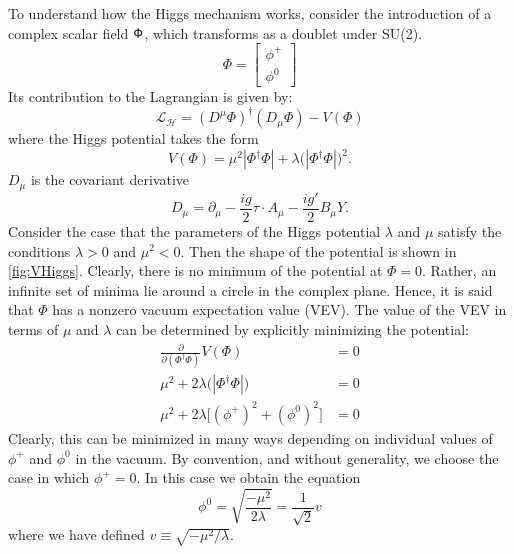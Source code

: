 To understand how the Higgs mechanism works, consider the introduction of a complex scalar field $\sf \Phi$, which 
transforms as a doublet under SU(2).
\begin{equation}
    \label{eqn:higgsField}
    \Phi = 
    \begin{bmatrix}
        \phi^{+} \\ 
        \phi^{0}
    \end{bmatrix}
\end{equation}
Its contribution to the Lagrangian is given by:
\begin{equation}
    \mathcal{L_{H}} = (D^{\mu}\Phi)^{\dagger}(D_{\mu}\Phi) - V(\Phi)
    \label{LHiggs}
\end{equation}
where the Higgs potential takes the form
\begin{equation}
    V(\Phi) = \mu^{2}|\Phi^{\dagger}\Phi| + \lambda \Big(|\Phi^{\dagger}\Phi|\Big)^{2}.
    \label{VHiggs}
\end{equation}
$D_{\mu}$ is the covariant derivative
\begin{equation}
    D_{\mu} = \partial_{\mu} - \frac{ig}{2}\tau\cdot A_{\mu} - \frac{ig'}{2}B_{\mu}Y.
    \label{EWCovariantDeriv}
\end{equation}
Consider the case that the parameters of the Higgs potential $\lambda$ and $\mu$ satisfy the conditions 
$\lambda > 0$ and $\mu^{2} < 0$. Then the shape of the potential is shown in \ref{fig:VHiggs}. Clearly, there is no minimum of the 
potential at $\Phi = 0$. Rather, an infinite set of minima lie around a circle in the complex plane. Hence, it is said that $\Phi$ 
has a nonzero vacuum expectation value (VEV). The value of the VEV in terms of $\mu$ and $\lambda$ can be determined by explicitly
minimizing the potential:
\begin{align}
    \frac{\partial}{\partial(\Phi^{\dagger}\Phi)}V(\Phi) &= 0 \\
    \mu^{2} + 2\lambda\Big(|\Phi^{\dagger}\Phi|\Big) &= 0 \\
    \mu^{2} + 2\lambda\Big[(\phi^{+})^{2} + (\phi^{0})^{2}\Big] &= 0 
    \label{VHiggsMinimization}
\end{align}
Clearly, this can be minimized in many ways depending on individual values of $\phi^{+}$ and $\phi^{0}$ in the vacuum. By convention,
and without generality, we choose the case in which $\phi^{+} = 0$. In this case we obtain the equation
\begin{equation}
    \phi^{0} = \sqrt{\frac{-\mu^{2}}{2\lambda}} = \frac{1}{\sqrt{2}}v
\end{equation}
where we have defined $v \equiv \sqrt{-\mu^{2}/\lambda}$.

